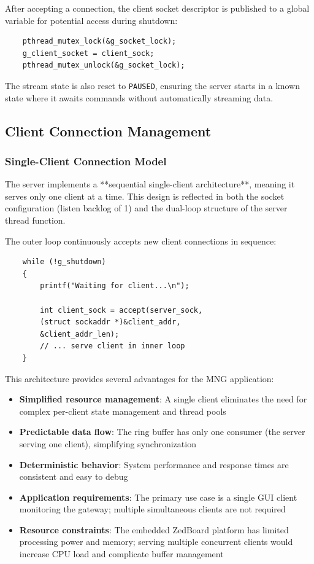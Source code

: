 After accepting a connection, the client socket descriptor is published to a global variable for potential access during shutdown:

\begin{verbatim}
	pthread_mutex_lock(&g_socket_lock);
	g_client_socket = client_sock;
	pthread_mutex_unlock(&g_socket_lock);
\end{verbatim}

The stream state is also reset to \texttt{PAUSED}, ensuring the server starts in a known state where it awaits commands without automatically streaming data.


\subsection{Client Connection Management}

\subsubsection{Single-Client Connection Model}

The server implements a **sequential single-client architecture**, meaning it serves only one client at a time. This design is reflected in both the socket configuration (listen backlog of 1) and the dual-loop structure of the server thread function.

The outer loop continuously accepts new client connections in sequence:

\begin{verbatim}
	while (!g_shutdown)
	{
		printf("Waiting for client...\n");
		
		int client_sock = accept(server_sock,
		(struct sockaddr *)&client_addr,
		&client_addr_len);
		// ... serve client in inner loop
	}
\end{verbatim}

This architecture provides several advantages for the MNG application:

\begin{itemize}
	\item \textbf{Simplified resource management}: A single client eliminates the need for complex per-client state management and thread pools
	\item \textbf{Predictable data flow}: The ring buffer has only one consumer (the server serving one client), simplifying synchronization
	\item \textbf{Deterministic behavior}: System performance and response times are consistent and easy to debug
	\item \textbf{Application requirements}: The primary use case is a single GUI client monitoring the gateway; multiple simultaneous clients are not required
	\item \textbf{Resource constraints}: The embedded ZedBoard platform has limited processing power and memory; serving multiple concurrent clients would increase CPU load and complicate buffer management
\end{itemize}

